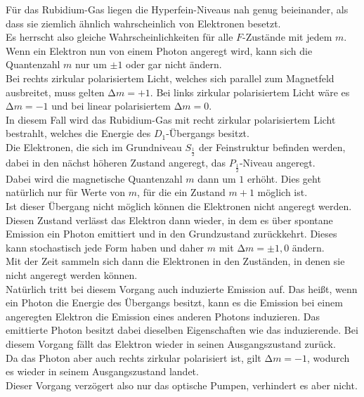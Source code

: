 \noindent
Für das Rubidium-Gas liegen die Hyperfein-Niveaus nah genug beieinander, als dass sie ziemlich ähnlich wahrscheinlich von Elektronen besetzt.\\
Es herrscht also gleiche Wahrscheinlichkeiten für alle $F$-Zustände mit jedem $m$.\\
Wenn ein Elektron nun von einem Photon angeregt wird, kann sich die Quantenzahl $m$ nur um $\pm 1$ oder gar nicht ändern.\\
Bei rechts zirkular polarisiertem Licht, welches sich parallel zum Magnetfeld ausbreitet, muss gelten $\increment m = +1$. 
Bei links zirkular polarisiertem Licht wäre es $\increment m = -1$ und bei linear polarisiertem $\increment m = 0$.\\
In diesem Fall wird das Rubidium-Gas mit recht zirkular polarisiertem Licht bestrahlt, welches die Energie des $D_1$-Übergangs besitzt.\\
Die Elektronen, die sich im Grundniveau $S_{\frac{1}{2}}$ der Feinstruktur befinden werden, dabei in den nächst höheren Zustand angeregt, 
das $P_{\frac{1}{2}}$-Niveau angeregt.\\
Dabei wird die magnetische Quantenzahl $m$ dann um $1$ erhöht. 
Dies geht natürlich nur für Werte von $m$, für die ein Zustand $m+1$ möglich ist.\\
Ist dieser Übergang nicht möglich können die Elektronen nicht angeregt werden.\\
Diesen Zustand verlässt das Elektron dann wieder, in dem es über spontane Emission ein Photon emittiert und in den Grundzustand zurückkehrt.
Dieses kann stochastisch jede Form haben und daher $m$ mit $\increment m = \pm 1,0$ ändern.\\
Mit der Zeit sammeln sich dann die Elektronen in den Zuständen, in denen sie nicht angeregt werden können.\\
Natürlich tritt bei diesem Vorgang auch induzierte Emission auf.
Das heißt, wenn ein Photon die Energie des Übergangs besitzt, kann es die Emission bei einem angeregten Elektron die Emission eines anderen Photons induzieren.
Das emittierte Photon besitzt dabei dieselben Eigenschaften wie das induzierende. Bei diesem Vorgang fällt das Elektron wieder in seinen Ausgangszustand zurück.\\
Da das Photon aber auch rechts zirkular polarisiert ist, gilt $\increment m = -1$, wodurch es wieder in seinem Ausgangszustand landet.\\
Dieser Vorgang verzögert also nur das optische Pumpen, verhindert es aber nicht.


